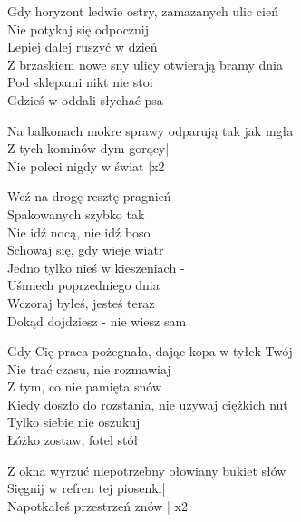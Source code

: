 \begin{text}
    Gdy horyzont ledwie ostry, zamazanych ulic cień\\
    Nie potykaj się odpocznij\\
    Lepiej dalej ruszyć w dzień\\
    Z brzaskiem nowe sny ulicy otwierają bramy dnia\\
    Pod sklepami nikt nie stoi\\
    Gdzieś w oddali słychać psa

    Na balkonach mokre sprawy odparują tak jak mgła\\
    Z tych kominów dym gorący|\\
    Nie poleci nigdy w świat |x2

    \vin Weź na drogę resztę pragnień\\
    \vin Spakowanych szybko tak\\
    \vin Nie idź nocą, nie idź boso\\
    \vin Schowaj się, gdy wieje wiatr\\
    \vin Jedno tylko nieś w kieszeniach -\\
    \vin Uśmiech poprzedniego dnia\\
    \vin Wczoraj byłeś, jesteś teraz\\
    \vin Dokąd dojdziesz - nie wiesz sam

    Gdy Cię praca pożegnała, dając kopa w tyłek Twój\\
    Nie trać czasu, nie rozmawiaj\\
    Z tym, co nie pamięta snów\\
    Kiedy doszło do rozstania, nie używaj ciężkich nut\\
    Tylko siebie nie oszukuj\\
    Łóżko zostaw, fotel stół

    Z okna wyrzuć niepotrzebny ołowiany bukiet słów\\
    Sięgnij w refren tej piosenki|\\
    Napotkałeś przestrzeń znów   | x2
\end{text}
\begin{chord}

\end{chord}